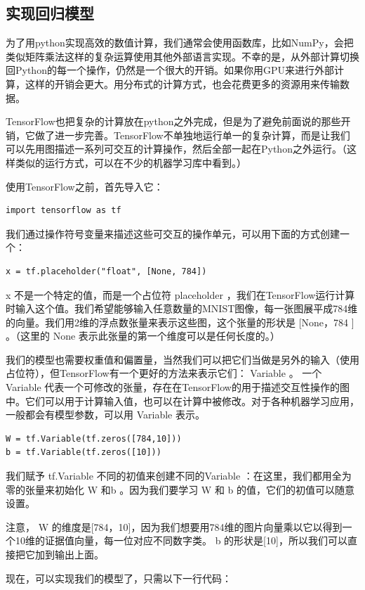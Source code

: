 \documentclass[a4paper,11pt,twoside]{ctexbook}
\begin{document}
\subsection {实现回归模型}
为了用python实现高效的数值计算，我们通常会使用函数库，比如NumPy，会把类似矩阵乘法这样的复杂运算使用其他外部语言实现。不幸的是，从外部计算切换回Python的每一个操作，仍然是一个很大的开销。如果你用GPU来进行外部计算，这样的开销会更大。用分布式的计算方式，也会花费更多的资源用来传输数据。

TensorFlow也把复杂的计算放在python之外完成，但是为了避免前面说的那些开销，它做了进一步完善。TensorFlow不单独地运行单一的复杂计算，而是让我们可以先用图描述一系列可交互的计算操作，然后全部一起在Python之外运行。（这样类似的运行方式，可以在不少的机器学习库中看到。）

使用TensorFlow之前，首先导入它：
\begin{lstlisting}
import tensorflow as tf
\end{lstlisting}
我们通过操作符号变量来描述这些可交互的操作单元，可以用下面的方式创建一个：
\begin{lstlisting}
x = tf.placeholder("float", [None, 784])
\end{lstlisting}
x 不是一个特定的值，而是一个占位符 placeholder ，我们在TensorFlow运行计算时输入这个值。我们希望能够输入任意数量的MNIST图像，每一张图展平成784维的向量。我们用2维的浮点数张量来表示这些图，这个张量的形状是 [None，784 ] 。（这里的 None 表示此张量的第一个维度可以是任何长度的。）

我们的模型也需要权重值和偏置量，当然我们可以把它们当做是另外的输入（使用占位符），但TensorFlow有一个更好的方法来表示它们： Variable 。 一个 Variable 代表一个可修改的张量，存在在TensorFlow的用于描述交互性操作的图中。它们可以用于计算输入值，也可以在计算中被修改。对于各种机器学习应用，一般都会有模型参数，可以用 Variable 表示。

\begin{lstlisting}
W = tf.Variable(tf.zeros([784,10]))
b = tf.Variable(tf.zeros([10]))
\end{lstlisting}

我们赋予 tf.Variable 不同的初值来创建不同的Variable ：在这里，我们都用全为零的张量来初始化 W 和b 。因为我们要学习 W 和 b 的值，它们的初值可以随意设置。

注意， W 的维度是[784，10]，因为我们想要用784维的图片向量乘以它以得到一个10维的证据值向量，每一位对应不同数字类。 b 的形状是[10]，所以我们可以直接把它加到输出上面。

现在，可以实现我们的模型了，只需以下一行代码：
\end{document}
